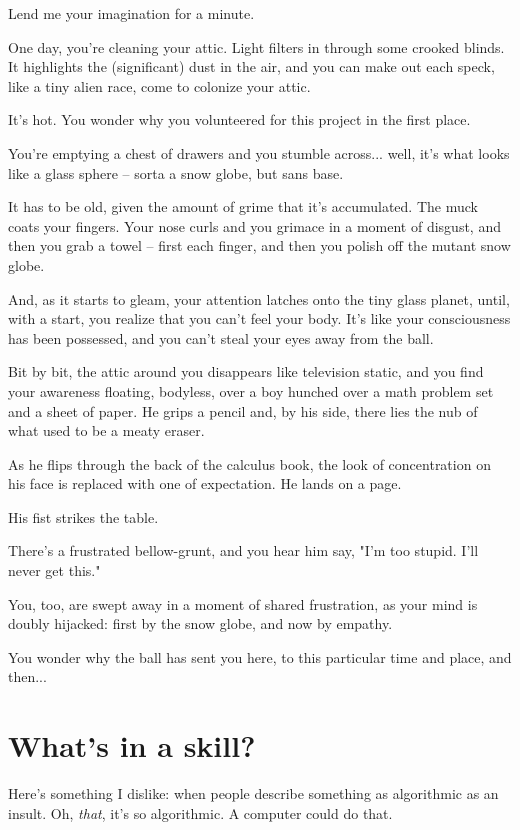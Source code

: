 Lend me your imagination for a minute.

One day, you're cleaning your attic. Light filters in through some crooked
blinds. It highlights the (significant) dust in the air, and you can make out
each speck, like a tiny alien race, come to colonize your attic. 

It's hot. You wonder why you volunteered for this project in the first place.

You're emptying a chest of drawers and you stumble across... well, it's what
looks like a glass sphere -- sorta a snow globe, but sans base.

It has to be old, given the amount of grime that it's accumulated. The muck
coats your fingers. Your nose curls and you grimace in a moment of disgust, and then you grab a
towel -- first each finger, and then you polish off the mutant snow
globe.

And, as it starts to gleam, your attention latches onto the tiny glass planet,
until, with a start, you realize that you can't feel your body. It's like your
consciousness has been possessed, and you can't steal your eyes away from the
ball.

Bit by bit, the attic around you disappears like television static, and you find your awareness floating,
bodyless, over a boy hunched over a math problem set and a sheet of paper. He
grips a pencil and, by his side, there lies the nub of what used to be a meaty
eraser.

As he flips through the back of the calculus book, the look of concentration on
his face is replaced with one of expectation. He lands on a page. 

His fist strikes the table.

There's a frustrated bellow-grunt, and you hear him say, "I'm too stupid. I'll
never get this."

You, too, are swept away in a moment of shared frustration, as your mind is
doubly hijacked: first by the snow globe, and now by empathy.

You wonder why the ball has sent you here, to this particular time and place,
and then...

\section{What's in a skill? }

Here's something I dislike: when people describe something as algorithmic as an
insult. Oh, \textit{that}, it's so algorithmic. A computer could do that.

